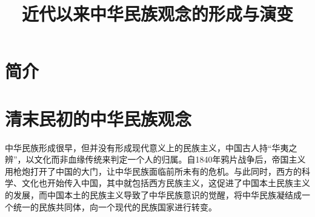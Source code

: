 \documentclass{article}
\begin{document}

\title{近代以来中华民族观念的形成与演变}



	





\section{简介}









\section{清末民初的中华民族观念}
	中华民族形成很早，但并没有形成现代意义上的民族主义，中国古人持“华夷之辨”，以文化而非血缘传统来判定一个人的归属。自1840年鸦片战争后，帝国主义用枪炮打开了中国的大门，让中华民族面临前所未有的危机。与此同时，西方的科学、文化也开始传入中国，其中就包括西方民族主义，这促进了中国本土民族主义的发展，而中国本土的民族主义导致了中华民族意识的觉醒，将中华民族凝结成一个统一的民族共同体，向一个现代的民族国家进行转变。
\end{document}
